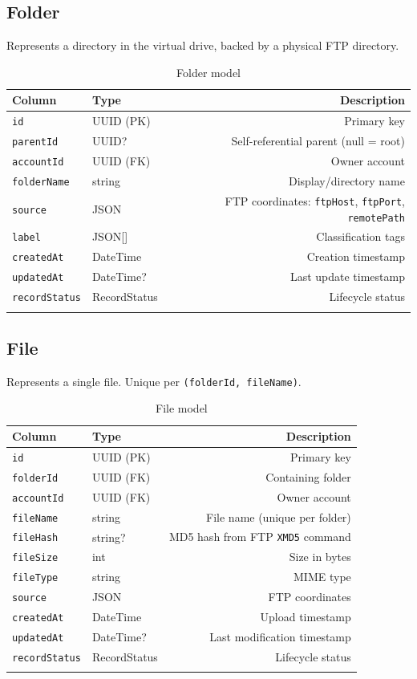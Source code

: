 \documentclass[12pt,a4paper]{article}
\begin{document}
\subsection{Folder}

Represents a directory in the virtual drive, backed by a physical FTP directory.

\begin{longtable}{llD}
\toprule
\textbf{Column} & \textbf{Type} & \textbf{Description} \\
\midrule
\texttt{id}           & UUID (PK)    & Primary key \\
\texttt{parentId}     & UUID?        & Self-referential parent (null = root) \\
\texttt{accountId}    & UUID (FK)    & Owner account \\
\texttt{folderName}   & string       & Display/directory name \\
\texttt{source}       & JSON         & FTP coordinates: \texttt{ftpHost}, \texttt{ftpPort}, \texttt{remotePath} \\
\texttt{label}        & JSON[]       & Classification tags \\
\texttt{createdAt}    & DateTime     & Creation timestamp \\
\texttt{updatedAt}    & DateTime?    & Last update timestamp \\
\texttt{recordStatus} & RecordStatus & Lifecycle status \\
\bottomrule
\caption{Folder model}
\end{longtable}

\subsection{File}

Represents a single file. Unique per \texttt{(folderId, fileName)}.

\begin{longtable}{llD}
\toprule
\textbf{Column} & \textbf{Type} & \textbf{Description} \\
\midrule
\texttt{id}           & UUID (PK)    & Primary key \\
\texttt{folderId}     & UUID (FK)    & Containing folder \\
\texttt{accountId}    & UUID (FK)    & Owner account \\
\texttt{fileName}     & string       & File name (unique per folder) \\
\texttt{fileHash}     & string?      & MD5 hash from FTP \texttt{XMD5} command \\
\texttt{fileSize}     & int          & Size in bytes \\
\texttt{fileType}     & string       & MIME type \\
\texttt{source}       & JSON         & FTP coordinates \\
\texttt{createdAt}    & DateTime     & Upload timestamp \\
\texttt{updatedAt}    & DateTime?    & Last modification timestamp \\
\texttt{recordStatus} & RecordStatus & Lifecycle status \\
\bottomrule
\caption{File model}
\end{longtable}
\end{document}
